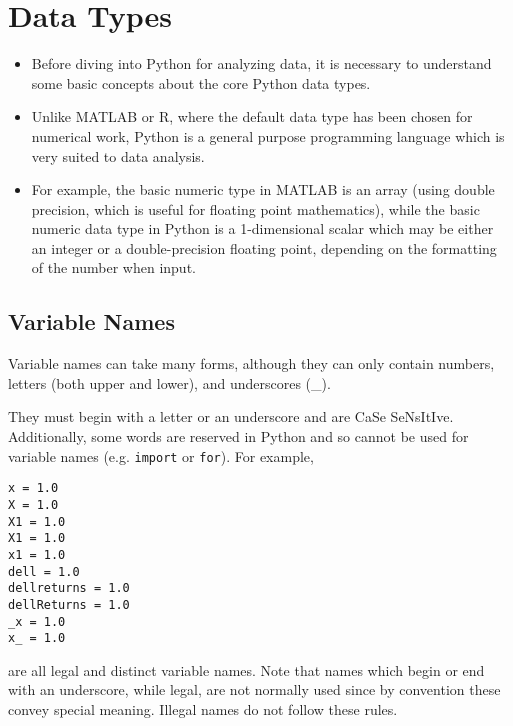 \documentclass[Pydata.tex]{subfiles}
\begin{document}
 






\section{Data Types}
\begin{itemize}
\item Before diving into Python for analyzing data, it is necessary to 
understand some basic concepts about the core Python data types.

\item Unlike MATLAB or R, where the default data type has been chosen for numerical work, Python is 
 a general purpose programming language which is very suited to data analysis.

\item For example,
the basic numeric type in MATLAB is an array (using double precision, which is useful for floating point
mathematics), while the basic numeric data type in Python is a 1-dimensional scalar which may be either
an integer or a double-precision floating point, depending on the formatting of the number when input.
\end{itemize}

\subsection{ Variable Names}
Variable names can take many forms, although they can only contain numbers, letters (both upper and
lower), and underscores (\_). 

\noindent They must begin with a letter or an underscore and are CaSe SeNsItIve.
Additionally, some words are reserved in Python and so cannot be used for variable names (e.g. \texttt{import} or \texttt{for}). For example,

\begin{framed}
\begin{verbatim}
x = 1.0
X = 1.0
X1 = 1.0
X1 = 1.0
x1 = 1.0
dell = 1.0
dellreturns = 1.0
dellReturns = 1.0
_x = 1.0
x_ = 1.0
\end{verbatim}
\end{framed}

are all legal and distinct variable names. Note that names which begin or end with an underscore, while
legal, are not normally used since by convention these convey special meaning.
 Illegal names do not
follow these rules.
\newpage
\end{document}
